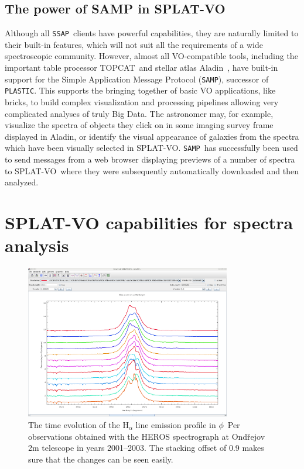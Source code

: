 \documentclass[final,authoryear,5p,times,twocolumn]{elsarticle}
\newcommand{\ssap}{\texttt{SSAP}}
\newcommand{\plastic}{\texttt{PLASTIC}}
\newcommand{\samp}{\texttt{SAMP}}
\newcommand{\splatvo}{{\textsf{\small{SPLAT-VO}}}}
\newcommand{\topcat}{\textsf{\small TOPCAT}}
\newcommand{\aladin}{\textsf{\small Aladin}}
\newcommand{\ascl}[1]{\href{http://www.ascl.net/#1}{ascl:#1}}
\begin{document}
\subsection{The power of SAMP in SPLAT-VO}

Although all \ssap\ clients have powerful capabilities, they are naturally
limited to their built-in features, which will not suit all the requirements of
a wide spectroscopic community. However, almost all VO-compatible tools,
including the important table processor \topcat\ and stellar atlas \aladin\
\citep[][\ascl{1112.019}]{2005ASPC..347..193O}, have built-in support for the
Simple Application Message Protocol (\samp), successor of \plastic. This
supports the bringing together of basic VO applications, like bricks, to build
complex visualization and processing pipelines allowing very complicated
analyses of truly Big Data.  The astronomer may, for example, visualize the
spectra of objects they click on in some imaging survey frame displayed in
\aladin, or identify the visual appearance of galaxies from the spectra which
have been visually selected in \splatvo. \samp\ has successfully been used to
send messages from a web browser displaying previews of a number of spectra to
\splatvo\ where they were subsequently automatically downloaded and then
analyzed.

\section{SPLAT-VO capabilities  for spectra analysis}

\begin{figure}[t]
\begin{center}
\includegraphics[width=0.8\textwidth]{phiper-heros-stack.pdf}
\caption{The time evolution of the H$_\alpha$ line emission profile in
$\phi$~Per observations obtained with the HEROS spectrograph at Ond\v{r}ejov 2m
telescope in years 2001--2003. The stacking offset of 0.9  makes sure that the changes can be seen easily.}

\label{fig:phiper-heros-stack}
\end{center}
\end{figure}
\end{document}
